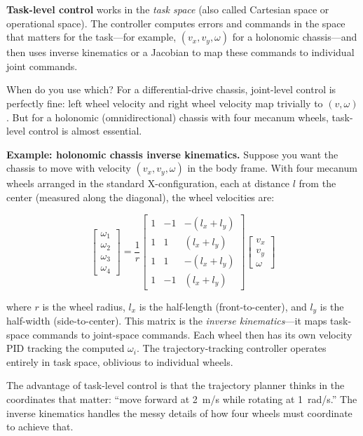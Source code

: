 \textbf{Task-level control} works in the \textit{task space} (also called Cartesian space or operational space). The controller computes errors and commands in the space that matters for the task---for example, $(v_x, v_y, \omega)$ for a holonomic chassis---and then uses inverse kinematics or a Jacobian to map these commands to individual joint commands.

When do you use which? For a differential-drive chassis, joint-level control is perfectly fine: left wheel velocity and right wheel velocity map trivially to $(v, \omega)$. But for a holonomic (omnidirectional) chassis with four mecanum wheels, task-level control is almost essential.

\textbf{Example: holonomic chassis inverse kinematics.} Suppose you want the chassis to move with velocity $(v_x, v_y, \omega)$ in the body frame. With four mecanum wheels arranged in the standard X-configuration, each at distance $l$ from the center (measured along the diagonal), the wheel velocities are:

\begin{equation}
\begin{bmatrix} \omega_1 \\ \omega_2 \\ \omega_3 \\ \omega_4 \end{bmatrix}
= \frac{1}{r}
\begin{bmatrix}
1 & -1 & -(l_x + l_y) \\
1 &  1 &  (l_x + l_y) \\
1 &  1 & -(l_x + l_y) \\
1 & -1 &  (l_x + l_y)
\end{bmatrix}
\begin{bmatrix} v_x \\ v_y \\ \omega \end{bmatrix}
\end{equation}

where $r$ is the wheel radius, $l_x$ is the half-length (front-to-center), and $l_y$ is the half-width (side-to-center). This matrix is the \textit{inverse kinematics}---it maps task-space commands to joint-space commands. Each wheel then has its own velocity PID tracking the computed $\omega_i$. The trajectory-tracking controller operates entirely in task space, oblivious to individual wheels.

The advantage of task-level control is that the trajectory planner thinks in the coordinates that matter: ``move forward at 2~m/s while rotating at 1~rad/s.'' The inverse kinematics handles the messy details of how four wheels must coordinate to achieve that.

